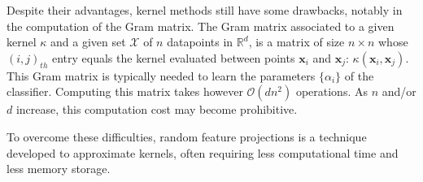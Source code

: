 Despite their advantages, kernel methods still have some drawbacks, notably in the computation of the Gram matrix. The Gram matrix associated to a given kernel $\kappa$ and a given set $\mathcal{X}$ of $n$ datapoints in $\mathbb{R}^d$, is a matrix of size $n\times n$ whose $(i,j)_{th}$ entry equals the kernel evaluated between points $\mathbf{x}_i$ and $\mathbf{x}_j$: $\kappa(\mathbf{x}_i, \mathbf{x}_j)$. This Gram matrix is typically needed to learn the parameters $\{\alpha_i\}$ of the classifier. Computing this matrix takes however $\mathcal{O}(dn^2)$ operations. As $n$ and/or $d$ increase, this computation cost may become prohibitive. 


To overcome these difficulties, random feature projections is a technique developed to approximate kernels, often requiring less computational time and less memory storage.

